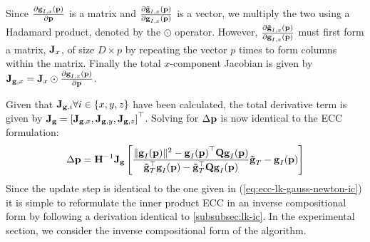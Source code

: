 Since $\frac{\partial \bb{g}_{I,x}(\p)}{\partial \p}$ is a matrix and
$\frac{\partial \bb{\tilde{g}}_{I,x}(\p)}{\partial \bb{g}_{I,x}(\p)}$ is
a vector, we multiply the two using a Hadamard product, denoted
by the $\odot$ operator. However, $\frac{\partial
\bb{\tilde{g}}_{I,x}(\p)}{\partial \bb{g}_{I,x}(\p)}$ must first form a
matrix, $\bb{J}_x$, of size $D \times p$ by repeating the vector $p$
times to form columns within the matrix. Finally the total $x$-component
Jacobian is given by
$\bb{J}_{\bb{g},x} = \bb{J}_x \odot \frac{\partial \bb{g}_{I,x}(\p)}{\partial \p}$.

Given that $\bb{J}_{\bb{g},i} \forall i \in \{ x,y,z \}$ have been
calculated, the total derivative term is given by
 $\bb{J}_{\bb{g}} = {\left[ \bb{J}_{\bb{g},x}, \bb{J}_{\bb{g},y}, \bb{J}_{\bb{g},z} \right]}^{\top}$. 
Solving for $\Delta \p$ is now identical to the ECC formulation:
\begin{equation}\label{eq:ip-ecc-lk-gauss-newton}
    \Delta \p = \bb{H}^{-1} \bb{J_g} \left[ \frac{\norm{\bb{g}_I(\p)}^2 - {\bb{g}_I(\p)}^{\top} \bb{Q} \bb{g}_I(\p)}{\bb{\tilde{g}}_T^{\top} \bb{g}_I(\p) - \bb{\tilde{g}}_T^{\top} \bb{Q} \bb{g}_I(\p)} \bb{\tilde{g}}_T - \bb{g}_I(\p) \right]
\end{equation}
Since the update step is identical to the one given in 
(\ref{eq:ecc-lk-gauss-newton-ic}) it is simple to reformulate the inner product 
ECC in an inverse compositional form by following a derivation identical to 
\cref{subsubsec:lk-ic}. In the experimental section, we consider the inverse
compositional form of the algorithm.
